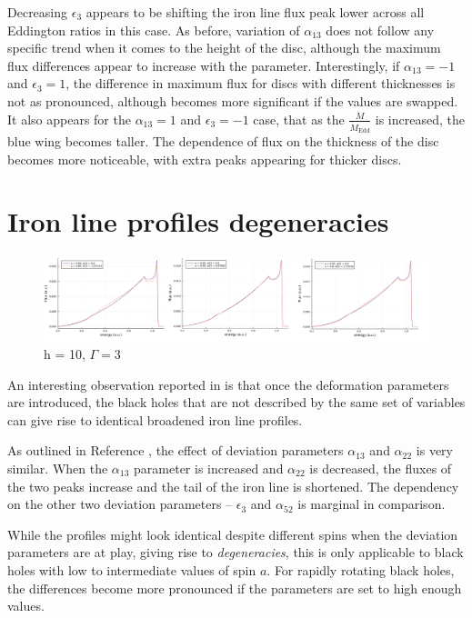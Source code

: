 \documentclass[fleqn,usenatbib,useAMS]{mnras}
\begin{document}
Decreasing $\epsilon_{3}$ appears to be shifting the iron line flux peak lower across all Eddington ratios in this case. As before, variation of $\alpha_{13}$ does not follow any specific trend when it comes to the height of the disc, although the maximum flux differences appear to increase with the parameter.  Interestingly, if $\alpha_{13} = -1$ and $\epsilon_{3} = 1$, the difference in maximum flux for discs with different thicknesses is not as pronounced, although becomes more significant if the values are swapped. It also appears for the $\alpha_{13} = 1$ and $\epsilon_{3} = -1$ case, that as the $\frac{\dot{M}}{\dot{M}_\text{Edd}}$ is increased, the blue wing becomes taller. The dependence of flux on the thickness of the disc becomes more noticeable, with extra peaks appearing for thicker discs. 

\section{Iron line profiles degeneracies}

\begin{figure}
    \centering
    \includegraphics[width=0.98\linewidth]{figures/johannsen_h10_Gamma3.png}
    \caption{h = 10, $\Gamma = 3$}
    \label{johannsen_degeneracy}
\end{figure}

An interesting observation reported in \cite{johannsen2014x} is that once the deformation parameters are introduced, the black holes that are not described by the same set of variables can give rise to identical broadened iron line profiles.

As outlined in Reference \cite{johannsen2014x}, the effect of deviation parameters $\alpha_{13}$ and $\alpha_{22}$ is very similar. When the $\alpha_{13}$ parameter is increased and $\alpha_{22}$ is decreased, the fluxes of the two peaks increase and the tail of the iron line is shortened. The dependency on the other two deviation parameters -- $\epsilon_{3}$ and $\alpha_{52}$ is marginal in comparison.

While the profiles might look identical despite different spins when the deviation parameters are at play, giving rise to \textit{degeneracies}, this is only applicable to black holes with low to intermediate values of spin $a$. For rapidly rotating black holes, the differences become more pronounced if the parameters are set to high enough values\cite{johannsen2014x}. 
\end{document}
